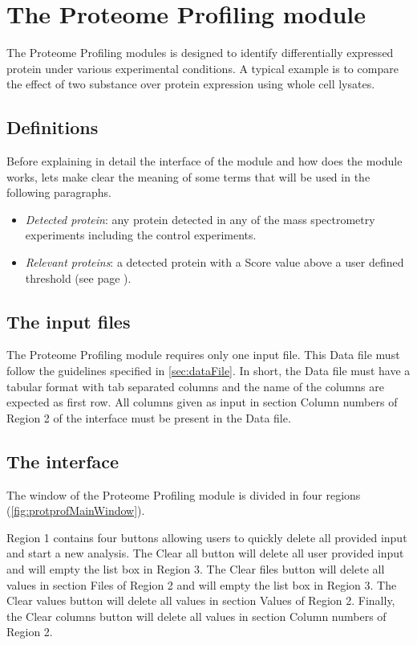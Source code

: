 \chapter{The Proteome Profiling module}
\label{chap:protprof}

The Proteome Profiling modules is designed to identify differentially expressed protein under various experimental conditions. A typical example is to compare the effect of two substance over protein expression using whole cell lysates.

\section{Definitions}

Before explaining in detail the interface of the module and how does the module works, lets make clear the meaning of some terms that will be used in the following paragraphs.

\begin{itemize}
	\item \textit{Detected protein}: any protein detected in any of the mass spectrometry experiments including the control experiments.
	\item \textit{Relevant proteins}: a detected protein with a Score value above a user defined threshold (see page \pageref{par:protprofScoreValue}).
\end{itemize}

\section{The input files}

The Proteome Profiling module requires only one input file. This Data file must follow the guidelines specified in \autoref{sec:dataFile}. In short, the Data file must have a tabular format with tab separated columns and the name of the columns are expected as first row. All columns given as input in section Column numbers of Region \num{2} of the interface must be present in the Data file.

\section{The interface}

The window of the Proteome Profiling module is divided in four regions (\autoref{fig:protprofMainWindow}). 

Region \num{1} contains four buttons allowing users to quickly delete all provided input and start a new analysis. The Clear all button will delete all user provided input and will empty the list box in Region \num{3}. The Clear files button will delete all values in section Files of Region \num{2} and will empty the list box in Region \num{3}. The Clear values button will delete all values in section Values of Region \num{2}. Finally, the Clear columns button will delete all values in section Column numbers of Region \num{2}. 

